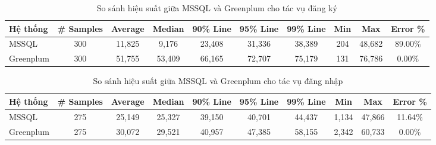 \begin{table}[htbp]
\centering
\renewcommand{\arraystretch}{1.2} %
\setlength{\tabcolsep}{4pt} %
\begin{tabular}{|l|c|c|c|c|c|c|c|c|c|}
\hline
\textbf{Hệ thống} & \textbf{\# Samples} & \textbf{Average} & \textbf{Median} & \textbf{90\% Line} & \textbf{95\% Line} & \textbf{99\% Line} & \textbf{Min} & \textbf{Max} & \textbf{Error \%} \\ \hline
MSSQL & 300 & 11,825 & 9,176 & 23,408 & 31,336 & 38,389 & 204 & 48,682 & 89.00\% \\ \hline
Greenplum & 300 & 51,755 & 53,409 & 66,165 & 72,707 & 75,179 & 131 & 76,786 & 0.00\% \\ \hline
\end{tabular}
\caption{So sánh hiệu suất giữa MSSQL và Greenplum cho tác vụ đăng ký}
\label{tab:performance_comparison_registration}
\end{table}

\begin{table}[htbp]
\centering
\renewcommand{\arraystretch}{1.2} %
\setlength{\tabcolsep}{3.9pt} %
\begin{tabular}{|l|c|c|c|c|c|c|c|c|c|}
\hline
\textbf{Hệ thống} & \textbf{\# Samples} & \textbf{Average} & \textbf{Median} & \textbf{90\% Line} & \textbf{95\% Line} & \textbf{99\% Line} & \textbf{Min} & \textbf{Max} & \textbf{Error \%} \\ \hline
MSSQL & 275 & 25,149 & 25,327 & 39,150 & 40,701 & 44,437 & 1,134 & 47,866 & 11.64\% \\ \hline
Greenplum & 275 & 30,072 & 29,521 & 40,957 & 47,385 & 58,155 & 2,342 & 60,733 & 0.00\% \\ \hline
\end{tabular}
\caption{So sánh hiệu suất giữa MSSQL và Greenplum cho tác vụ đăng nhập}
\label{tab:performance_comparison_login}
\end{table}


